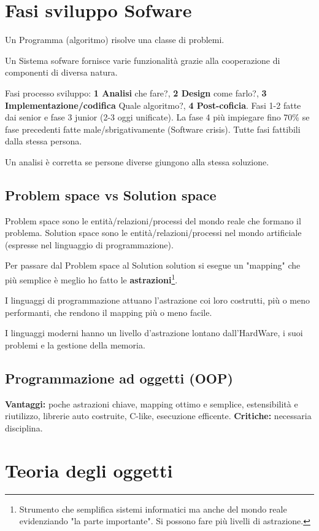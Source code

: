 \section{Fasi sviluppo Sofware}
Un Programma (algoritmo) risolve una classe di problemi.

Un Sistema sofware fornisce varie funzionalità grazie alla cooperazione di componenti di diversa natura.

Fasi processo sviluppo: \textbf{1 Analisi} che fare?, \textbf{2 Design} come farlo?, \textbf{3 Implementazione/codifica} Quale algoritmo?, \textbf{4 Post-coficia}.
Fasi 1-2 fatte dai senior e fase 3 junior (2-3 oggi unificate). La fase 4 più impiegare fino 70\% se fase precedenti fatte male/sbrigativamente (Software crisis).
Tutte fasi fattibili dalla stessa persona.

Un analisi è corretta se persone diverse giungono alla stessa soluzione.

\subsection{Problem space vs Solution space}
Problem space sono le entità/relazioni/processi del mondo reale che formano il problema. Solution space sono le entità/relazioni/processi nel mondo artificiale (espresse nel linguaggio di programmazione).

Per passare dal Problem space al Solution solution si esegue un "mapping" che più semplice è meglio ho fatto le \textbf{astrazioni}\footnote{Strumento che semplifica sistemi informatici ma anche del mondo reale evidenziando "la parte importante". Si possono fare più livelli di astrazione.}.

I linguaggi di programmazione attuano l'astrazione coi loro costrutti, più o meno performanti, che rendono il mapping più o meno facile.

I linguaggi moderni hanno un livello d'astrazione lontano dall'HardWare, i suoi problemi e la gestione della memoria.

\subsection{Programmazione ad oggetti (OOP)}
\textbf{Vantaggi:} poche astrazioni chiave, mapping ottimo e semplice, estensibilità e riutilizzo, librerie auto costruite, C-like, esecuzione efficente. \textbf{Critiche:} necessaria disciplina.

\section{Teoria degli oggetti}

